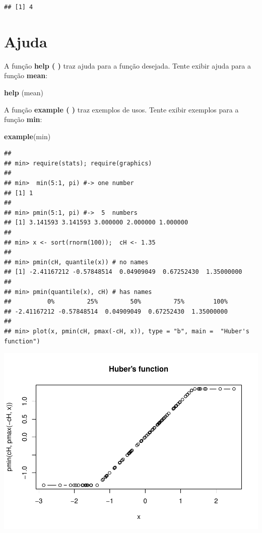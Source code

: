 \documentclass[]{book}
\newenvironment{Shaded}{\begin{snugshade}}{\end{snugshade}}
\newcommand{\KeywordTok}[1]{\textcolor[rgb]{0.13,0.29,0.53}{\textbf{#1}}}
\newcommand{\NormalTok}[1]{#1}
\begin{document}
\begin{verbatim}
## [1] 4
\end{verbatim}

\hypertarget{ajuda}{%
\section{Ajuda}\label{ajuda}}

A função \textbf{help ( )} traz ajuda para a função desejada. Tente exibir ajuda para a função \textbf{mean}:

\begin{Shaded}
\begin{Highlighting}[]
\KeywordTok{help}\NormalTok{ (mean)}
\end{Highlighting}
\end{Shaded}

A função \textbf{example ( )} traz exemplos de usos. Tente exibir exemplos para a função \textbf{min}:

\begin{Shaded}
\begin{Highlighting}[]
\KeywordTok{example}\NormalTok{(min)}
\end{Highlighting}
\end{Shaded}

\begin{verbatim}
## 
## min> require(stats); require(graphics)
## 
## min>  min(5:1, pi) #-> one number
## [1] 1
## 
## min> pmin(5:1, pi) #->  5  numbers
## [1] 3.141593 3.141593 3.000000 2.000000 1.000000
## 
## min> x <- sort(rnorm(100));  cH <- 1.35
## 
## min> pmin(cH, quantile(x)) # no names
## [1] -2.41167212 -0.57848514  0.04909049  0.67252430  1.35000000
## 
## min> pmin(quantile(x), cH) # has names
##          0%         25%         50%         75%        100% 
## -2.41167212 -0.57848514  0.04909049  0.67252430  1.35000000 
## 
## min> plot(x, pmin(cH, pmax(-cH, x)), type = "b", main =  "Huber's function")
\end{verbatim}

\includegraphics{TudodoR_files/figure-latex/unnamed-chunk-14-1.pdf}
\end{document}
